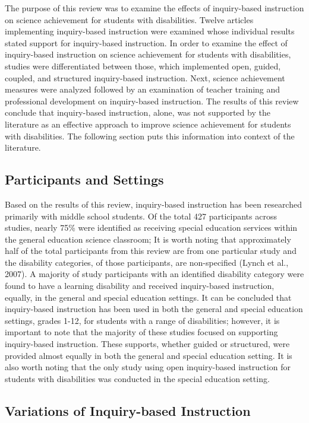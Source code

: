 \documentclass[11.5pt]{sig-alternate} %
\begin{document}
\begin{large}
The purpose of this review was to examine the effects of inquiry-based instruction on science achievement for students with disabilities. Twelve articles implementing inquiry-based instruction were examined whose individual results stated support for inquiry-based instruction.  In order to examine the effect of inquiry-based instruction on science achievement for students with disabilities, studies were differentiated between those, which implemented open, guided, coupled, and structured inquiry-based instruction.  Next, science achievement measures were analyzed followed by an examination of teacher training and professional development on inquiry-based instruction.  The results of this review conclude that inquiry-based instruction, alone, was not supported by the literature as an effective approach to improve science achievement for students with disabilities.  The following section puts this information into context of the literature.  

\subsection*{Participants and Settings}

Based on the results of this review, inquiry-based instruction has been researched primarily with middle school students.  Of the total 427 participants across studies, nearly 75\% were identified as receiving special education services within the general education science classroom; It is worth noting that approximately half of the total participants from this review are from one particular study and the disability categories, of those participants, are non-specified (Lynch et al., 2007).  A majority of study participants with an identified disability category were found to have a learning disability and received inquiry-based instruction, equally, in the general and special education settings.  It can be concluded that inquiry-based instruction has been used in both the general and special education settings, grades 1-12, for students with a range of disabilities; however, it is important to note that the majority of these studies focused on supporting inquiry-based instruction.  These supports, whether guided or structured, were provided almost equally in both the general and special education setting.  It is also worth noting that the only study using open inquiry-based instruction for students with disabilities was conducted in the special education setting.

\subsection*{Variations of Inquiry-based Instruction}


\end{large}
\end{document}
